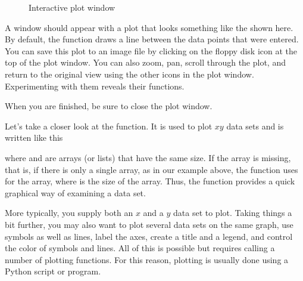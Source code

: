 \documentclass[letterpaper,10pt,english]{sphinxmanual}
\begin{document}
\begin{figure}[htbp]
\centering
\capstart

\noindent{}
\caption{Interactive plot window}\label{\detokenize{chap5/chap5_plot:id1}}\label{\detokenize{chap5/chap5_plot:fig-zigzagplotdemo}}\end{figure}

\sphinxAtStartPar
A window should appear with a plot that looks something like the {\hyperref[\detokenize{chap5/chap5_plot:fig-zigzagplotdemo}]{}} shown here.  By default, the  function draws a line between the data points that were entered.  You can save this plot to an image file by clicking on the floppy disk icon at the top of the plot window.  You can also zoom, pan, scroll through the plot, and return to the original view using the other icons in the plot window.  Experimenting with them reveals their functions.

\sphinxAtStartPar
When you are finished, be sure to close the plot window.

\sphinxAtStartPar
Let’s take a closer look at the  function.  It is used to plot \(x\)\sphinxhyphen{}\(y\) data sets and is written like this

\begin{sphinxVerbatim}[commandchars=\\\{\}]
 
\end{sphinxVerbatim}

\sphinxAtStartPar
where  and  are arrays (or lists) that have the same size.  If the  array is missing, that is, if there is only a single array, as in our example above, the  function uses  for the  array, where  is the size of the  array.  Thus, the  function provides a quick graphical way of examining a data set.

\sphinxAtStartPar
More typically, you supply both an \(x\) and a \(y\) data set to plot.  Taking things a bit further, you may also want to plot several data sets on the same graph, use symbols as well as lines, label the axes, create a title and a legend, and control the color of symbols and lines.  All of this is possible but requires calling a number of plotting functions.  For this reason, plotting is usually done using a Python script or program.
\end{document}
